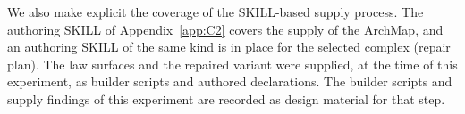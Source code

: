We also make explicit the coverage of the SKILL-based supply process. The authoring SKILL of Appendix~\ref{app:C2} covers the
supply of the ArchMap, and an authoring SKILL of the same kind is in
place for the selected complex (repair plan). The law surfaces and the
repaired variant were supplied, at the time of this experiment, as
builder scripts and authored declarations. The builder scripts and
supply findings of this experiment are recorded as design material for
that step.
